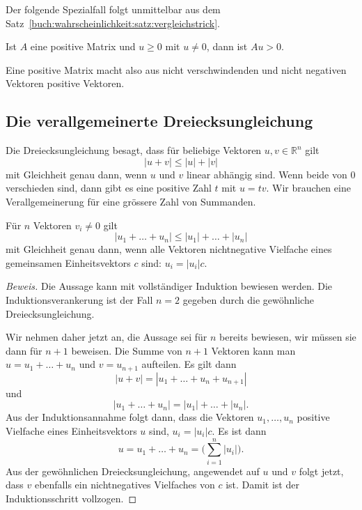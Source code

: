 Der folgende Spezialfall folgt unmittelbar aus dem
Satz~\ref{buch:wahrscheinlichkeit:satz:vergleichstrick}.

\begin{korollar}
\label{buch:wahrscheinlichkeit:satz:Au>0korollar}
Ist $A$ eine positive Matrix und $u\ge 0$ mit $u\ne 0$, dann
ist $Au>0$.
\end{korollar}

Eine positive Matrix macht also aus nicht verschwindenden
und nicht negativen Vektoren positive Vektoren.

%
%
\subsection{Die verallgemeinerte Dreiecksungleichung
\label{buch:subsection:verallgemeinerte-dreiecksungleichung}}
Die Dreiecksungleichung besagt, dass für beliebige Vektoren
$u,v\in\mathbb{R}^n$ gilt
\[
|u+v|\le |u|+|v|
\]
mit Gleichheit genau dann, wenn $u$ und $v$ linear abhängig sind.
Wenn beide von $0$ verschieden sind, dann gibt es eine positive Zahl
$t$ mit $u=tv$.
Wir brauchen eine Verallgemeinerung für eine grössere Zahl von
Summanden.

\begin{satz}
\label{buch:wahrscheinlichkeit:satz:verallgemeinerte-dreiecksungleichung}
Für $n$ Vektoren $v_i\ne 0$ gilt
\[
|u_1+\dots+u_n| \le |u_1|+\dots+|u_n|
\]
mit Gleichheit genau dann, wenn alle Vektoren nichtnegative Vielfache
eines gemeinsamen Einheitsvektors $c$ sind: $u_i=|u_i|c$.
\end{satz}

\begin{proof}[Beweis]
Die Aussage kann mit vollständiger Induktion bewiesen werden.
Die Induktionsverankerung ist der Fall $n=2$ gegeben durch die
gewöhnliche Dreiecksungleichung.

Wir nehmen daher jetzt an, die Aussage sei für $n$ bereits bewiesen,
wir müssen sie dann für $n+1$ beweisen.
Die Summe von $n+1$ Vektoren kann man $u=u_1+\dots+u_n$ und $v=u_{n+1}$
aufteilen.
Es gilt dann
\[
|u+v|
=
|u_1+\dots+u_n+u_{n+1}|
\]
und
\[
|u_1+\dots+u_n| = |u_1|+\dots+|u_n|.
\]
Aus der Induktionsannahme folgt dann, dass die Vektoren $u_1,\dots,u_n$
positive Vielfache eines Einheitsvektors $u$ sind, $u_i=|u_i|c$.
Es ist dann
\[
u=u_1+\dots+u_n = \biggl(\sum_{i=1}^n |u_i|\biggr).
\]
Aus der gewöhnlichen Dreiecksungleichung, angewendet auf $u$ und $v$
folgt jetzt, dass $v$ ebenfalls ein nichtnegatives Vielfaches von $c$ ist.
Damit ist der Induktionsschritt vollzogen.
\end{proof}

